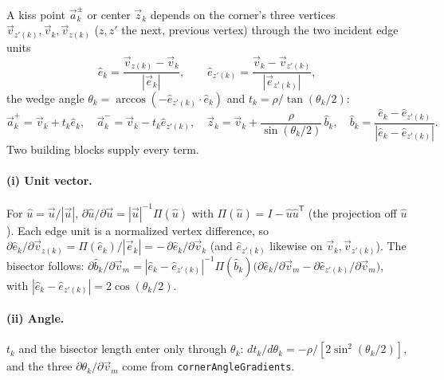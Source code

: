 \documentclass[11pt]{article}
\newcommand{\vv}[1]{\vec{#1}}
\begin{document}
A kiss point $\vv a^{\pm}_k$ or center $\vv z_k$ depends on the corner's three vertices $\vv
v_{z'(k)},\vv v_k,\vv v_{z(k)}$ ($z,z'$ the next, previous vertex) through the two incident edge
units
\[
  \hat e_k=\frac{\vv v_{z(k)}-\vv v_k}{|\vv e_k|},\qquad
  \hat e_{z'(k)}=\frac{\vv v_k-\vv v_{z'(k)}}{|\vv e_{z'(k)}|},
\]
the wedge angle $\theta_k=\arccos(-\hat e_{z'(k)}\!\cdot\!\hat e_k)$ and $t_k=\rho/\tan(\theta_k/2)$:
\[
  \vv a^{+}_k=\vv v_k+t_k\hat e_k,\quad
  \vv a^{-}_k=\vv v_k-t_k\hat e_{z'(k)},\quad
  \vv z_k=\vv v_k+\frac{\rho}{\sin(\theta_k/2)}\,\hat b_k,\quad
  \hat b_k=\frac{\hat e_k-\hat e_{z'(k)}}{|\hat e_k-\hat e_{z'(k)}|}.
\]
Two building blocks supply every term.

\paragraph{(i) Unit vector.} For $\hat u=\vv u/|\vv u|$, $\partial\hat u/\partial\vv u=|\vv
u|^{-1}\Pi(\hat u)$ with $\Pi(\hat u)=I-\hat u\hat u^{\mathsf T}$ (the projection off $\hat u$). Each
edge unit is a normalized vertex difference, so $\partial\hat e_k/\partial\vv v_{z(k)}=\Pi(\hat
e_k)/|\vv e_k|=-\,\partial\hat e_k/\partial\vv v_k$ (and $\hat e_{z'(k)}$ likewise on $\vv v_k,\vv
v_{z'(k)}$). The bisector follows: $\partial\hat b_k/\partial\vv v_m=|\hat e_k-\hat
e_{z'(k)}|^{-1}\Pi(\hat b_k)\big(\partial\hat e_k/\partial\vv v_m-\partial\hat e_{z'(k)}/\partial\vv
v_m\big)$, with $|\hat e_k-\hat e_{z'(k)}|=2\cos(\theta_k/2)$.

\paragraph{(ii) Angle.} $t_k$ and the bisector length enter only through $\theta_k$:
$dt_k/d\theta_k=-\rho/[2\sin^2(\theta_k/2)]$, and the three $\partial\theta_k/\partial\vv v_m$ come
from \texttt{cornerAngleGradients}.
\end{document}
